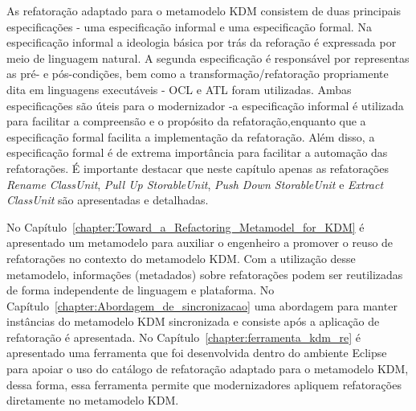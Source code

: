 As refatoração adaptado para o metamodelo KDM consistem de duas principais especificações - uma especificação informal e uma especificação formal. Na especificação informal a ideologia básica por trás da reforação é expressada por meio de linguagem natural. A segunda especificação é responsável por representas as pré- e pós-condições, bem como a transformação/refatoração propriamente dita em linguagens executáveis - OCL e ATL foram utilizadas. Ambas especificações são úteis para o modernizador -a especificação informal é utilizada para facilitar a compreensão e o propósito da refatoração,enquanto que a especificação formal facilita a implementação da refatoração. Além disso, a especificação formal é de extrema importância para facilitar a automação das refatorações. É importante destacar que neste capítulo apenas as refatorações \textit{Rename ClassUnit}, \textit{Pull Up StorableUnit}, \textit{Push Down StorableUnit} e \textit{Extract ClassUnit} são apresentadas e detalhadas.

No Capítulo~\ref{chapter:Toward_a_Refactoring_Metamodel_for_KDM} é apresentado um metamodelo para auxiliar o engenheiro a promover o reuso de refatorações no contexto do metamodelo KDM. Com a utilização desse metamodelo, informações (metadados) sobre refatorações podem ser reutilizadas de forma independente de linguagem e plataforma. No Capítulo~\ref{chapter:Abordagem_de_sincronizacao} uma abordagem para manter instâncias do metamodelo KDM sincronizada e consiste após a aplicação de refatoração é apresentada. No Capítulo~\ref{chapter:ferramenta_kdm_re} é apresentado uma ferramenta que foi desenvolvida dentro do ambiente Eclipse para apoiar o uso do catálogo de refatoração adaptado para o metamodelo KDM, dessa forma, essa ferramenta permite que modernizadores apliquem refatorações diretamente no metamodelo KDM. 
